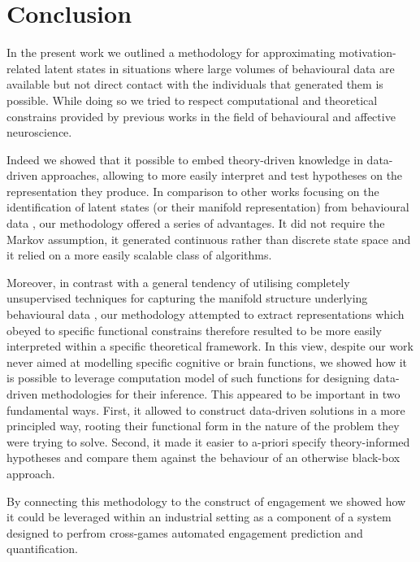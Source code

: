 \section{Conclusion}
In the present work we outlined a methodology for approximating motivation-related latent states in situations where large volumes of behavioural data are available but not direct contact with the individuals that generated them is possible. While doing so we tried to respect computational and theoretical constrains provided by previous works in the field of behavioural and affective neuroscience. 

Indeed we showed that it possible to embed theory-driven knowledge in data-driven approaches, allowing to more easily interpret and test hypotheses on the representation they produce. In comparison to other works focusing on the identification of latent states (or their manifold representation) from behavioural data \cite{calhoun2019unsupervised, luxem2020identifying, pereira2020quantifying, shi2021learning, mccullough2021unsupervised}, our methodology offered a series of advantages. It did not require the Markov assumption, it generated continuous rather than discrete state space and it relied on a more easily scalable class of algorithms. 

Moreover, in contrast with a general tendency of utilising completely unsupervised techniques for capturing the manifold structure underlying behavioural data \cite{calhoun2019unsupervised, luxem2020identifying, pereira2020quantifying, shi2021learning, mccullough2021unsupervised}, our methodology attempted to extract representations which obeyed to specific functional constrains therefore resulted to be more easily interpreted within a specific theoretical framework. In this view, despite our work never aimed at modelling specific cognitive or brain functions, we showed how it is possible to leverage computation model of such functions for designing data-driven methodologies for their inference. This appeared to be important in two fundamental ways. First, it allowed to construct data-driven solutions in a more principled way, rooting their functional form in the nature of the problem they were trying to solve. Second, it made it easier to a-priori specify theory-informed hypotheses and compare them against the behaviour of an otherwise black-box approach.

By connecting this methodology to the construct of engagement we showed how it could be leveraged within an industrial setting as a component of a system designed to perfrom cross-games automated engagement prediction and quantification.


